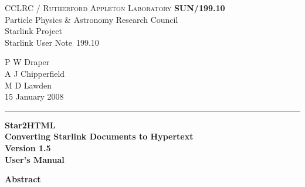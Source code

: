 \documentclass[twoside,11pt]{article}
\newcommand{\stardoccategory}  {Starlink User Note}
\newcommand{\stardocinitials}  {SUN}
\newcommand{\stardocnumber}    {199.10}
\newcommand{\stardocauthors}   {P W Draper\\
                                A J Chipperfield\\
                                M D Lawden}
\newcommand{\stardocdate}      {15 January 2008}
\newcommand{\stardoctitle}     {Star2HTML\\[1ex]
                                Converting Starlink Documents to Hypertext}
\newcommand{\stardocversion}   {Version 1.5}
\newcommand{\stardocmanual}    {User's Manual}
\newcommand{\stardocname}{\stardocinitials /\stardocnumber}
\newenvironment{latexonly}{}{}
\renewcommand{\_}{\texttt{\symbol{95}}}
\begin{document}
\thispagestyle{empty}

\begin{latexonly}
   CCLRC / \textsc{Rutherford Appleton Laboratory} \hfill \textbf{\stardocname}\\
   {\large Particle Physics \& Astronomy Research Council}\\
   {\large Starlink Project\\}
   {\large \stardoccategory\ \stardocnumber}
   \begin{flushright}
   \stardocauthors\\
   \stardocdate
   \end{flushright}
   \vspace{-4mm}
   \rule{\textwidth}{0.5mm}
   \vspace{5mm}
   \begin{center}
   {\Huge\textbf{\stardoctitle \\ [2.5ex]}}
   {\LARGE\textbf{\stardocversion \\ [4ex]}}
   {\Huge\textbf{\stardocmanual}}
   \end{center}
   \vspace{5mm}


   \vspace{10mm}
   \begin{center}
      {\Large\textbf{Abstract}}
   \end{center}
\end{latexonly}
\end{document}
